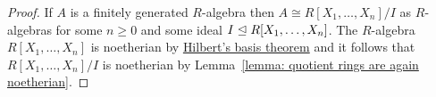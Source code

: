 \begin{proof}
  If $A$ is a finitely generated $R$-algebra then $A \cong R[X_1, \dotsc, X_n]/I$ as $R$-algebras for some $n \geq 0$ and some ideal $I \trianglelefteq R[X_1, \dotsc, X_n]$.
  The $R$-algebra $R[X_1, \dotsc, X_n]$ is noetherian by \hyperref[theorem: Hilberts basis theorem]{Hilbert's basis theorem} and it follows that $R[X_1, \dotsc, X_n]/I$ is noetherian by Lemma~\ref{lemma: quotient rings are again noetherian}.
\end{proof}




